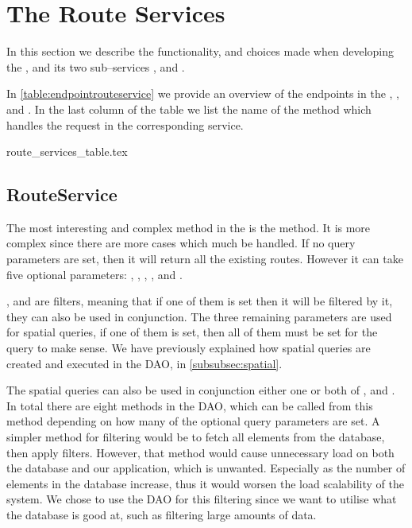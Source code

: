 \section{The Route Services}
In this section we describe the functionality, and choices made when developing the ,
and its two sub--services , and .

In \cref{table:endpointrouteservice} we provide an overview of the endpoints in the , , and .
In the last column of the table we list the name of the method which handles the request in the corresponding service.

{route_services_table.tex}

\subsection{RouteService}\label{subsec:routeservice}
The most interesting and complex method in the  is the  method.
It is more complex since there are more cases which much be handled.
If no query parameters are set, then it will return all the existing routes.
However it can take five optional parameters: , , , , and .

, and  are filters, meaning that if one of them is set then it will be filtered by it,
they can also be used in conjunction.
The three remaining parameters are used for spatial queries, if one of them is set, then all of them must be set for the query to make sense.
We have previously explained how spatial queries are created and executed in the \ac{DAO}, in \cref{subsubsec:spatial}.

The spatial queries can also be used in conjunction either one or both of , and .
In total there are eight methods in the \ac{DAO}, which can be called from this method depending on how many of the optional query parameters are set.
A simpler method for filtering would be to fetch all elements from the database, then apply filters.
However, that method would cause unnecessary load on both the database and our application, which is unwanted.
Especially as the number of elements in the database increase, thus it would worsen the load scalability of the system.
We chose to use the \ac{DAO} for this filtering since we want to utilise what the database is good at, such as filtering large amounts of data.

